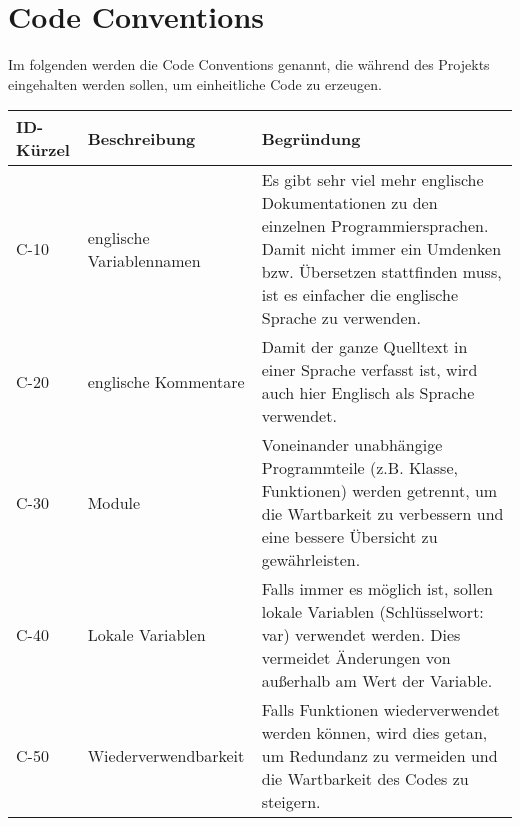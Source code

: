 

\chapter{Code Conventions}
Im folgenden werden die Code Conventions genannt, die während des Projekts eingehalten werden sollen, um einheitliche Code zu erzeugen.


\begin{tabularx}{\textwidth}{|l|X|X|}
    \toprule
    \textbf{ID-Kürzel} & \textbf{Beschreibung} & \textbf{Begründung}\\
    \midrule
    \endhead
    \hline
    \caption{Code Conventions}
    
    \endfoot
    C-10 & englische Variablennamen &  Es gibt sehr viel mehr englische Dokumentationen zu den einzelnen Programmiersprachen. Damit nicht immer ein Umdenken bzw. Übersetzen stattfinden muss, ist es einfacher die englische Sprache zu verwenden.\\ \hline
    C-20 & englische Kommentare & Damit der ganze Quelltext in einer Sprache verfasst ist, wird auch hier Englisch als Sprache verwendet.  \\ \hline
    C-30 & Module & Voneinander unabhängige Programmteile (z.B. Klasse, Funktionen) werden getrennt, um die Wartbarkeit zu verbessern und eine bessere Übersicht zu gewährleisten.  \\ \hline
    C-40 & Lokale Variablen & Falls immer es möglich ist, sollen lokale Variablen (Schlüsselwort: var) verwendet werden. Dies vermeidet Änderungen von außerhalb am Wert der Variable.\\ \hline
    C-50 & Wiederverwendbarkeit & Falls Funktionen wiederverwendet werden können, wird dies getan, um Redundanz zu vermeiden und die Wartbarkeit des Codes zu steigern.
  
\end{tabularx}



